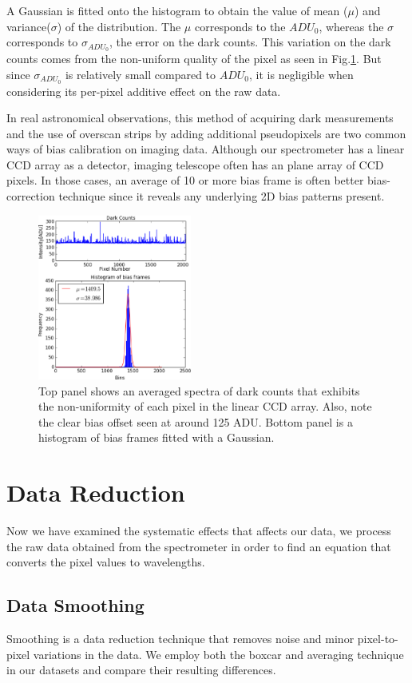 \documentclass[authoryear, 12pt,5p, times]{elsarticle}
\begin{document}
A Gaussian is fitted onto the histogram to obtain the value of mean ($\mu$) and variance($\sigma$) of the distribution. The $\mu$ corresponds to the $ADU_0$, whereas the $\sigma$ corresponds to $\sigma_{ADU_0}$, the error on the dark counts. This variation on the dark counts comes from the non-uniform quality of the pixel as seen in Fig.\ref{dark_counts}. But since $\sigma_{ADU_0}$ is relatively small compared to $ADU_0$, it is negligible when considering its per-pixel additive effect on the raw data.


In real astronomical observations, this method of acquiring dark measurements and the use of overscan strips by adding additional pseudopixels are two common ways of bias calibration on imaging data. Although our spectrometer has a linear CCD array as a detector, imaging telescope often has an plane array of CCD pixels. In those cases, an average of 10 or more bias frame is often better bias-correction technique since it reveals any underlying 2D bias patterns present. 
 \begin{figure}[h!]
\includegraphics[width=0.45\textwidth]{figures/dark&biashisto}
\caption{Top panel shows an averaged spectra of dark counts that exhibits the non-uniformity of each pixel in the linear CCD array. Also, note the clear bias offset seen at around 125 ADU. Bottom panel is a histogram of bias frames fitted with a Gaussian. } 
\label{dark_counts}
\end{figure}
\section{Data Reduction}
 Now we have examined the systematic effects that affects our data, we process the raw data obtained from the spectrometer in order to find an equation that converts the pixel values to wavelengths.
  \subsection{Data Smoothing}
  Smoothing is a data reduction technique that removes noise and minor pixel-to-pixel variations in the data. We employ both the boxcar and averaging technique in our datasets and compare their resulting differences.
\end{document}
